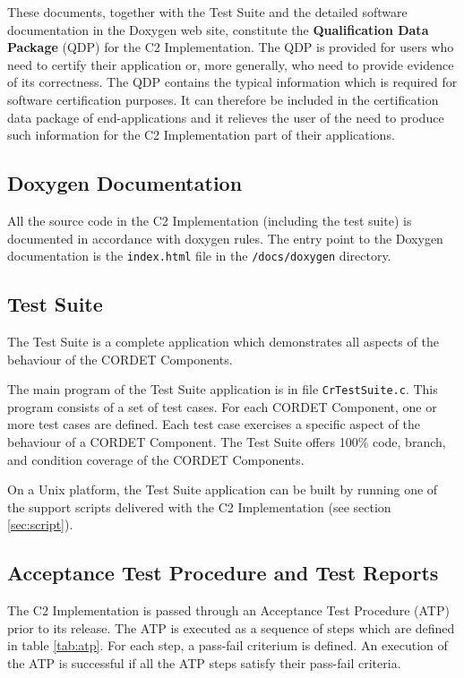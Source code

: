 \documentclass{pnp_article}
\begin{document}
These documents, together with the Test Suite and the detailed software documentation in the Doxygen web site, constitute the \textbf{Qualification Data Package} (QDP) for the C2 Implementation. The QDP is provided for users who need to certify their application or, more generally, who need to provide evidence of its correctness. The QDP contains the typical information which is required for software certification purposes. It can therefore be included in the certification data package of end-applications and it relieves the user of the need to produce such information for the C2 Implementation part of their applications.

\subsection{Doxygen Documentation}\label{sec:DoxygenDoc}
All the source code in the C2 Implementation (including the test suite) is documented in accordance with doxygen rules. The entry point to the Doxygen documentation is the \texttt{index.html} file in the \texttt{/docs/doxygen} directory.

\subsection{Test Suite}\label{sec:TestSuite}
The Test Suite is a complete application which demonstrates all aspects of the behaviour of the CORDET Components.

The main program of the Test Suite application is in file \texttt{CrTestSuite.c}. This program consists of a set of test cases. For each CORDET Component, one or more test cases are defined. Each test case exercises a specific aspect of the behaviour of a CORDET Component. The Test Suite offers 100\% code, branch, and condition coverage of the CORDET Components.

On a Unix platform, the Test Suite application can be built by running one of the support scripts delivered with the C2 Implementation (see section \ref{sec:script}). 

\subsection{Acceptance Test Procedure and Test Reports}\label{sec:atp}
The C2 Implementation is passed through an Acceptance Test Procedure (ATP) prior to its release. The ATP is executed as a sequence of steps which are defined in table \ref{tab:atp}. For each step, a pass-fail criterium is defined. An execution of the ATP is successful if all the ATP steps satisfy their pass-fail criteria.
\end{document}
